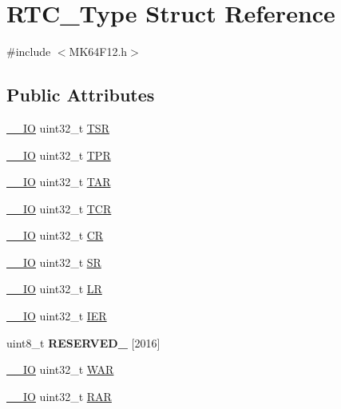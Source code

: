 \hypertarget{structRTC__Type}{}\section{R\+T\+C\+\_\+\+Type Struct Reference}
\label{structRTC__Type}


{\ttfamily \#include $<$M\+K64\+F12.\+h$>$}

\subsection*{Public Attributes}
\begin{DoxyCompactItemize}
\item 
\hyperlink{core__sc300_8h_aec43007d9998a0a0e01faede4133d6be}{\+\_\+\+\_\+\+IO} uint32\+\_\+t \hyperlink{structRTC__Type_a5c8182569d4fb9aa8403e3f5933058a6}{T\+SR}
\item 
\hyperlink{core__sc300_8h_aec43007d9998a0a0e01faede4133d6be}{\+\_\+\+\_\+\+IO} uint32\+\_\+t \hyperlink{structRTC__Type_ab718ffaf4897a4eec35a15790bae8806}{T\+PR}
\item 
\hyperlink{core__sc300_8h_aec43007d9998a0a0e01faede4133d6be}{\+\_\+\+\_\+\+IO} uint32\+\_\+t \hyperlink{structRTC__Type_ac67e5fa23e338883e5efd5b036164f26}{T\+AR}
\item 
\hyperlink{core__sc300_8h_aec43007d9998a0a0e01faede4133d6be}{\+\_\+\+\_\+\+IO} uint32\+\_\+t \hyperlink{structRTC__Type_a576676dbe6140e6ac08dfbf9a54aea17}{T\+CR}
\item 
\hyperlink{core__sc300_8h_aec43007d9998a0a0e01faede4133d6be}{\+\_\+\+\_\+\+IO} uint32\+\_\+t \hyperlink{structRTC__Type_ac5ff2c2ef6d58e8826deb51d8604c01e}{CR}
\item 
\hyperlink{core__sc300_8h_aec43007d9998a0a0e01faede4133d6be}{\+\_\+\+\_\+\+IO} uint32\+\_\+t \hyperlink{structRTC__Type_ae12dc1e198cb7aa7602e59e36bbf43b6}{SR}
\item 
\hyperlink{core__sc300_8h_aec43007d9998a0a0e01faede4133d6be}{\+\_\+\+\_\+\+IO} uint32\+\_\+t \hyperlink{structRTC__Type_ac72766ca7476a2a74bd14042bc88aa05}{LR}
\item 
\hyperlink{core__sc300_8h_aec43007d9998a0a0e01faede4133d6be}{\+\_\+\+\_\+\+IO} uint32\+\_\+t \hyperlink{structRTC__Type_a80ed5731d6b625b56c6bbeedd8f9bcb8}{I\+ER}
\item 
uint8\+\_\+t {\bfseries R\+E\+S\+E\+R\+V\+E\+D\+\_} \mbox{[}2016\mbox{]}\hypertarget{structRTC__Type_a146bcefe70d44a7a7568d276032f7604}{}\label{structRTC__Type_a146bcefe70d44a7a7568d276032f7604}

\item 
\hyperlink{core__sc300_8h_aec43007d9998a0a0e01faede4133d6be}{\+\_\+\+\_\+\+IO} uint32\+\_\+t \hyperlink{structRTC__Type_a701400edb86bacaa5c19309a90013cc6}{W\+AR}
\item 
\hyperlink{core__sc300_8h_aec43007d9998a0a0e01faede4133d6be}{\+\_\+\+\_\+\+IO} uint32\+\_\+t \hyperlink{structRTC__Type_ab35b8ebf2d7d05ced0f5d5cc61ac71af}{R\+AR}
\end{DoxyCompactItemize}


